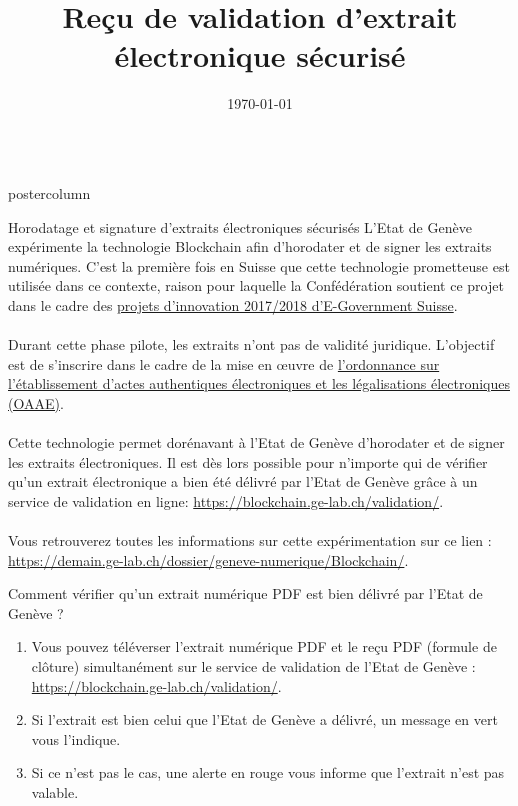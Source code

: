 \documentclass[roundedcorners=true, titleposition=center]{beamerthemeruhuisstijlposter}
\title{Reçu de validation d’extrait électronique sécurisé}
\date{\today}
\begin{document}
\begin{frame}
\begin{columns}
\begin{column}{0.95\textwidth}
\begin{beamercolorbox}[center, wd=\textwidth]{postercolumn}
\begin{minipage}[T]{0.95\textwidth}
\parbox[t][\columnheight]{\textwidth}{%
\begin{block}{Horodatage et signature d'extraits électroniques sécurisés}
L'Etat de Genève expérimente la technologie Blockchain afin d'horodater et de signer les extraits numériques. C'est la première fois en Suisse que cette technologie prometteuse est utilisée dans ce contexte, raison pour laquelle la Confédération soutient ce projet dans le cadre des \href{https://www.egovernment.ch/fr/umsetzung/innovationen/innovations-20172018/}{projets d'innovation 2017/2018 d'E-Government Suisse}.
\\
\\
Durant cette phase pilote, les extraits n'ont pas de validité juridique. L'objectif est de s'inscrire dans le cadre de la mise en œuvre de \href{https://www.admin.ch/opc/fr/classified-compilation/20111505/201701010000/943.033.pdf}{l'ordonnance sur l'établissement d'actes authentiques électroniques et les légalisations électroniques (OAAE)}.
\\
\\
Cette technologie permet dorénavant à l'Etat de Genève d'horodater et de signer les extraits électroniques. Il est dès lors possible pour n'importe qui de vérifier qu'un extrait électronique a bien été délivré par l'Etat de Genève grâce à un service de validation en ligne: \href{https://blockchain.ge-lab.ch/validation/}{https://blockchain.ge-lab.ch/validation/}.
\\
\\
Vous retrouverez toutes les informations sur cette expérimentation sur ce lien : \href{https://demain.ge-lab.ch/dossier/geneve-numerique/Blockchain/}{https://demain.ge-lab.ch/dossier/geneve-numerique/Blockchain/}.
\end{block}
\medskip
\begin{block}{Comment vérifier qu'un extrait numérique PDF est bien délivré par l'Etat de Genève ?}
\begin{enumerate}
\item Vous pouvez téléverser l'extrait numérique PDF et le reçu PDF (formule de clôture) simultanément sur le service de validation de l'Etat de Genève : \href{https://blockchain.ge-lab.ch/validation/}{https://blockchain.ge-lab.ch/validation/}.
\item Si l'extrait est bien celui que l'Etat de Genève a délivré, un message en vert vous l'indique.
\item Si ce n'est pas le cas, une alerte en rouge vous informe que l'extrait n'est pas valable.
\end{enumerate}
\end{block}
}
\end{minipage}
\end{beamercolorbox}
\end{column}
\end{columns}
\end{frame}
\end{document}
